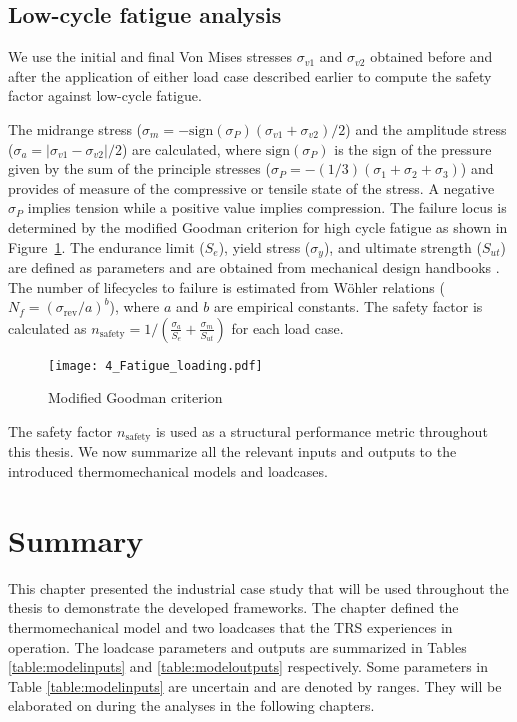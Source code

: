 \subsection{Low-cycle fatigue analysis} \label{subsec:fatigueanalysis}

We use the initial and final Von Mises stresses $\sigma_{v1}$ and $\sigma_{v2}$ obtained before and after the application of either load case described earlier to compute the safety factor against low-cycle fatigue.

The midrange stress ($\sigma_m = -\textrm{sign}(\sigma_P)\left( \sigma_{v1} + \sigma_{v2}\right) / 2$) and the amplitude stress ($\sigma_a = \left| \sigma_{v1} - \sigma_{v2}\right| / 2$) are calculated, where $\textrm{sign}(\sigma_P)$ is the sign of the pressure given by the sum of the principle stresses ($\sigma_P = -(1/3) (\sigma_1 + \sigma_2 + \sigma_3)$) and provides of measure of the compressive or tensile state of the stress. A negative $\sigma_P$ implies tension while a positive value implies compression. The failure locus is determined by the modified Goodman criterion for high cycle fatigue as shown in Figure~\ref{fig:GMcrit}. The endurance limit ($S_e$), yield stress ($\sigma_y$), and ultimate strength ($S_{ut}$) are defined as parameters and are obtained from mechanical design handbooks \cite{Budynas2015}. The number of lifecycles to failure is estimated from W{\"o}hler relations ($N_f = \left(\sigma_{\textrm{rev}}/a\right)^b$), where $a$ and $b$ are empirical constants. The safety factor is calculated as $n_{\textrm{safety}} = 1/\left({\frac{\sigma_a}{S_e}+\frac{\sigma_m}{S_{ut}}}\right)$ for each load case.

\begin{figure}[h!]
    \centering
    \texttt{[image: 4\_Fatigue\_loading.pdf]}
    \caption{ \label{fig:GMcrit} Modified Goodman criterion }
\end{figure}

The safety factor $n_{\textrm{safety}}$ is used as a structural performance metric throughout this thesis. We now summarize all the relevant inputs and outputs to the introduced thermomechanical models and loadcases.

\section{Summary}
\label{sec:thermosummary}

This chapter presented the industrial case study that will be used throughout the thesis to demonstrate the developed frameworks. The chapter defined the thermomechanical model and two loadcases that the \ac{TRS} experiences in operation. The loadcase parameters and outputs are summarized in Tables \ref{table:modelinputs} and \ref{table:modeloutputs} respectively. Some parameters in Table \ref{table:modelinputs} are uncertain and are denoted by ranges. They will be elaborated on during the analyses in the following chapters.

